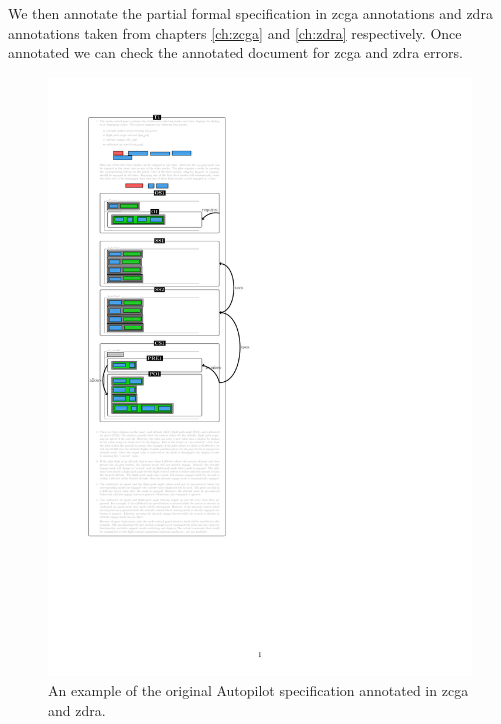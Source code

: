 We then annotate the partial formal specification in \gls{zcga} annotations and
\gls{zdra} annotations taken from chapters \ref{ch:zcga} and \ref{ch:zdra}
respectively. Once annotated we can check the annotated document for \gls{zcga}
and \gls{zdra} errors. 

\begin{figure}[H]
\centering
\begin{minipage}{0.45\textwidth}
\centering
\includegraphics[clip, trim=0cm 8cm 6cm 2cm, scale=0.6]{examples/semiform/1n2.pdf}
\vspace{-0.18in}
\caption{An example of the original Autopilot specification annotated in \gls{zcga} and \gls{zdra}. \label{fig:autopilot1n2}}
\vspace{-0.2in}
\end{minipage}\hfill
\begin{minipage}{0.45\textwidth}
\centering

\end{minipage}
\end{figure}
